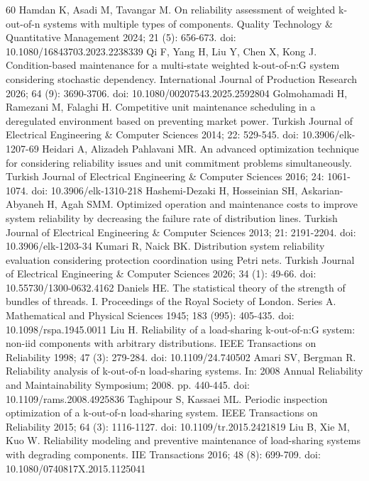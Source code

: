 \documentclass{elektr}
\begin{document}
\begin{thebibliography}{60}
 Hamdan K, Asadi M, Tavangar M. On reliability assessment of weighted k-out-of-n systems with multiple types of components. Quality Technology \& Quantitative Management 2024; 21 (5): 656-673. doi: 10.1080/16843703.2023.2238339
 Qi F, Yang H, Liu Y, Chen X, Kong J. Condition-based maintenance for a multi-state weighted k-out-of-n:G system considering stochastic dependency. International Journal of Production Research 2026; 64 (9): 3690-3706. doi: 10.1080/00207543.2025.2592804
 Golmohamadi H, Ramezani M, Falaghi H. Competitive unit maintenance scheduling in a deregulated environment based on preventing market power. Turkish Journal of Electrical Engineering \& Computer Sciences 2014; 22: 529-545. doi: 10.3906/elk-1207-69
 Heidari A, Alizadeh Pahlavani MR. An advanced optimization technique for considering reliability issues and unit commitment problems simultaneously. Turkish Journal of Electrical Engineering \& Computer Sciences 2016; 24: 1061-1074. doi: 10.3906/elk-1310-218
 Hashemi-Dezaki H, Hosseinian SH, Askarian-Abyaneh H, Agah SMM. Optimized operation and maintenance costs to improve system reliability by decreasing the failure rate of distribution lines. Turkish Journal of Electrical Engineering \& Computer Sciences 2013; 21: 2191-2204. doi: 10.3906/elk-1203-34
 Kumari R, Naick BK. Distribution system reliability evaluation considering protection coordination using Petri nets. Turkish Journal of Electrical Engineering \& Computer Sciences 2026; 34 (1): 49-66. doi: 10.55730/1300-0632.4162
 Daniels HE. The statistical theory of the strength of bundles of threads. I. Proceedings of the Royal Society of London. Series A. Mathematical and Physical Sciences 1945; 183 (995): 405-435. doi: 10.1098/rspa.1945.0011
 Liu H. Reliability of a load-sharing k-out-of-n:G system: non-iid components with arbitrary distributions. IEEE Transactions on Reliability 1998; 47 (3): 279-284. doi: 10.1109/24.740502
 Amari SV, Bergman R. Reliability analysis of k-out-of-n load-sharing systems. In: 2008 Annual Reliability and Maintainability Symposium; 2008. pp. 440-445. doi: 10.1109/rams.2008.4925836
 Taghipour S, Kassaei ML. Periodic inspection optimization of a k-out-of-n load-sharing system. IEEE Transactions on Reliability 2015; 64 (3): 1116-1127. doi: 10.1109/tr.2015.2421819
 Liu B, Xie M, Kuo W. Reliability modeling and preventive maintenance of load-sharing systems with degrading components. IIE Transactions 2016; 48 (8): 699-709. doi: 10.1080/0740817X.2015.1125041

\end{thebibliography}
\end{document}
